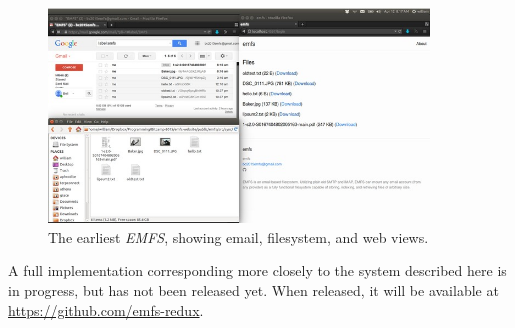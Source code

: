 \documentclass[12pt]{article}
\begin{document}
\begin{figure}[h]
\centering
\includegraphics[width=0.9\textwidth]{emfs1}
\caption{The earliest \textit{EMFS}, showing email, filesystem, and web views.}
\end{figure}

A full implementation corresponding more closely to the system described here
is in progress, but has not been released yet. When released, it will be
available at \url{https://github.com/emfs-redux}.

\newpage

\printbibliography
\end{document}
